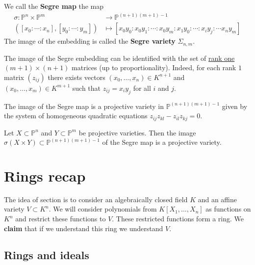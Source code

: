 \documentclass[12pt, a4paper]{article}
\newcommand{\PP}{\mathbb P}
\begin{document}
\begin{definition}
    We call the \textbf{Segre map} the map 
    \[\begin{aligned}
        \sigma: \PP^n \times \PP^m &\to \PP^{(n+1)(m+1)-1} \\
        \left( [x_0:\cdots:x_n],[y_0:\cdots:y_m] \right) &\mapsto [x_0y_0 : x_0y_1 : \cdots : x_0y_m : x_1y_0 : \cdots : x_iy_j:\cdots x_ny_m]
    \end{aligned}\]
    The image of the embedding is called the \textbf{Segre variety} \(\Sigma_{n,m}\).
\end{definition}

\begin{mdthm}
    The image of the Segre embedding can be identified with the set of \ul{rank one} \((m+1)\times(n+1)\) matrices (up to proportionality). Indeed, for each rank \(1\) matrix \((z_{ij})\) there exists vectors \((x_0,\ldots,x_n) \in K^{n+1}\) and \((x_0,\ldots,x_m) \in K^{m+1}\) such that \(z_{ij}=x_iy_j\) for all \(i\) and \(j\).
\end{mdthm}

\begin{proposition}
    The image of the Segre map is a projective variety in \(\PP^{(n+1)(m+1)-1}\) given by the system of homogeneous quadratic equations \(z_{ij}z_{kl}-z_{il}z_{kj}=0\).
\end{proposition}

\begin{corollary}
    Let \(X \subset \PP^n\) and \(Y \subset \PP^m\) be projective varieties. Then the image \(\sigma(X \times Y) \subset \PP^{(n+1)(m+1)-1}\) of the Segre map is a projective variety.
\end{corollary}

\section{Rings recap}

\begin{mdnote}
    The idea of section is to consider an algebraically closed field \(K\) and an affine variety \(V \subset K^n\). We will consider polynomials from \(K[X_1,\ldots,X_n]\) as functions on \(K^n\) and restrict these functions to \(V\). These restricted functions form a ring.
    We \textbf{claim} that if we understand this ring we understand \(V\).
\end{mdnote}

\subsection{Rings and ideals}
\end{document}
